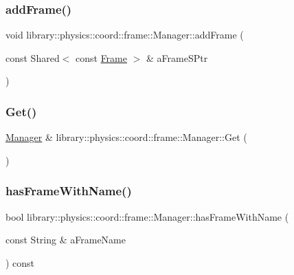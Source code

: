 \subsubsection{\texorpdfstring{add\+Frame()}{addFrame()}\hspace{0.1cm}{\footnotesize\ttfamily [2/2]}}
{\footnotesize\ttfamily void library\+::physics\+::coord\+::frame\+::\+Manager\+::add\+Frame (\begin{DoxyParamCaption}\item[{const Shared$<$ const \hyperlink{classlibrary_1_1physics_1_1coord_1_1_frame}{Frame} $>$ \&}]{a\+Frame\+S\+Ptr }\end{DoxyParamCaption})}

\mbox{\label{classlibrary_1_1physics_1_1coord_1_1frame_1_1_manager_ab17540188339548c7235a21236f8118e}} 
\subsubsection{\texorpdfstring{Get()}{Get()}}
{\footnotesize\ttfamily \hyperlink{classlibrary_1_1physics_1_1coord_1_1frame_1_1_manager}{Manager} \& library\+::physics\+::coord\+::frame\+::\+Manager\+::\+Get (\begin{DoxyParamCaption}{ }\end{DoxyParamCaption})\hspace{0.3cm}{\ttfamily [static]}}

\mbox{\label{classlibrary_1_1physics_1_1coord_1_1frame_1_1_manager_a842f8a8060172178930aed212c4fcf6d}} 
\subsubsection{\texorpdfstring{has\+Frame\+With\+Name()}{hasFrameWithName()}}
{\footnotesize\ttfamily bool library\+::physics\+::coord\+::frame\+::\+Manager\+::has\+Frame\+With\+Name (\begin{DoxyParamCaption}\item[{const String \&}]{a\+Frame\+Name }\end{DoxyParamCaption}) const}


